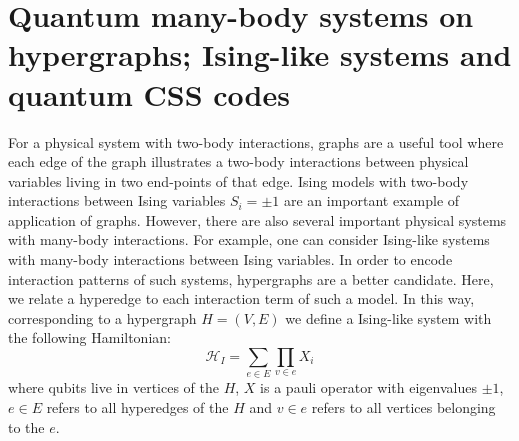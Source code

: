 \documentclass[preprintnumbers, showpacs, floatfix,twocolumn,
preprintnumbers, superscriptaddress]{revtex4}
\begin{document}
\section{Quantum many-body systems on hypergraphs; Ising-like systems and quantum CSS codes}\label{s2}
For a physical system with two-body interactions, graphs are a useful tool where each edge of the graph illustrates a two-body interactions between physical variables living in two end-points of that edge. Ising models with two-body interactions between Ising variables $S_i =\pm 1$ are an important example of application of graphs. However, there are also several important physical systems with many-body interactions. For example, one can consider Ising-like systems with many-body interactions between Ising variables. In order to encode interaction patterns of such systems, hypergraphs are a better candidate. Here, we relate a hyperedge to each interaction term of such a model. In this way, corresponding to a hypergraph $H=(V,E)$ we define a Ising-like system with the following Hamiltonian:
\begin{equation}
\mathcal{H}_I=\sum_{e\in E}\prod_{v\in e}X_i
\end{equation}
where qubits live in vertices of the $H$, $X$ is a pauli operator with eigenvalues $\pm 1$,  $e\in E$ refers to all hyperedges of the $H$ and $v\in e$ refers to all vertices belonging to the $e$.
\end{document}
